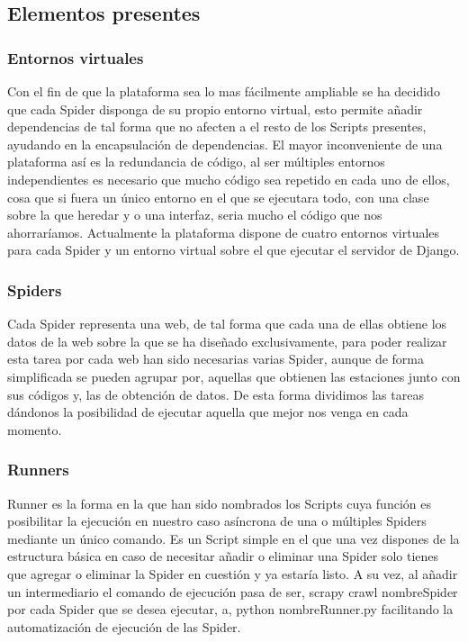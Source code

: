 \subsection{Elementos presentes}

\subsubsection{Entornos virtuales}
Con el fin de que la plataforma sea lo mas fácilmente ampliable se ha decidido que cada Spider disponga de su propio entorno virtual, esto permite añadir dependencias de tal forma que no afecten a el resto de los Scripts presentes, ayudando en la encapsulación de dependencias.
El mayor inconveniente de una plataforma así es la redundancia de código, al ser múltiples entornos independientes es necesario que mucho código sea repetido en cada uno de ellos, cosa que si fuera un único entorno en el que se ejecutara todo, con una clase sobre la que heredar y o una interfaz, seria mucho el código que nos ahorraríamos.
Actualmente la plataforma dispone de cuatro entornos virtuales para cada Spider y un entorno virtual sobre el que ejecutar el servidor de Django.

\subsubsection{Spiders}
Cada Spider representa una web, de tal forma que cada una de ellas obtiene los datos de la web sobre la que se ha diseñado exclusivamente, para poder realizar esta tarea por cada web han sido necesarias varias Spider, aunque de forma simplificada se pueden agrupar por, aquellas que obtienen las estaciones junto con sus códigos y, las de obtención de datos.
De esta forma dividimos las tareas dándonos la posibilidad de ejecutar aquella que mejor nos venga en cada momento.

\subsubsection{Runners}
Runner es la forma en la que han sido nombrados los Scripts cuya función es posibilitar la ejecución en nuestro caso asíncrona de una o múltiples Spiders mediante un único comando.
Es un Script simple en el que una vez dispones de la estructura básica en caso de necesitar añadir o eliminar una Spider solo tienes que agregar o eliminar la Spider en cuestión y ya estaría listo.
A su vez, al añadir un intermediario el comando de ejecución pasa de ser, scrapy crawl nombreSpider por cada Spider que se desea ejecutar, a, python nombreRunner.py facilitando la automatización de ejecución de las Spider.

